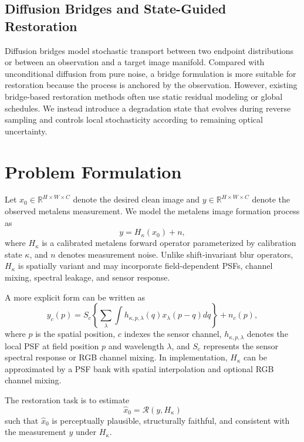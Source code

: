 \documentclass[journal]{IEEEtran}
\newcommand{\R}{\mathbb{R}}
\newcommand{\hk}{H_{\kappa}}
\begin{document}
\subsection{Diffusion Bridges and State-Guided Restoration}
Diffusion bridges model stochastic transport between two endpoint distributions or between an observation and a target image manifold. Compared with unconditional diffusion from pure noise, a bridge formulation is more suitable for restoration because the process is anchored by the observation. However, existing bridge-based restoration methods often use static residual modeling or global schedules. We instead introduce a degradation state that evolves during reverse sampling and controls local stochasticity according to remaining optical uncertainty.

\section{Problem Formulation}
Let $x_0 \in \R^{H\times W\times C}$ denote the desired clean image and $y \in \R^{H\times W\times C}$ denote the observed metalens measurement. We model the metalens image formation process as
\begin{equation}
    y = \hk(x_0) + n,
    \label{eq:forward_basic}
\end{equation}
where $\hk$ is a calibrated metalens forward operator parameterized by calibration state $\kappa$, and $n$ denotes measurement noise. Unlike shift-invariant blur operators, $\hk$ is spatially variant and may incorporate field-dependent PSFs, channel mixing, spectral leakage, and sensor response.

A more explicit form can be written as
\begin{equation}
    y_c(p)=S_c\left\{\sum_{\lambda}\int h_{\kappa,p,\lambda}(q)x_{\lambda}(p-q)dq\right\}+n_c(p),
    \label{eq:forward_explicit}
\end{equation}
where $p$ is the spatial position, $c$ indexes the sensor channel, $h_{\kappa,p,\lambda}$ denotes the local PSF at field position $p$ and wavelength $\lambda$, and $S_c$ represents the sensor spectral response or RGB channel mixing. In implementation, $\hk$ can be approximated by a PSF bank with spatial interpolation and optional RGB channel mixing.

The restoration task is to estimate
\begin{equation}
    \hat{x}_0 = \mathcal{R}(y,\hk)
\end{equation}
such that $\hat{x}_0$ is perceptually plausible, structurally faithful, and consistent with the measurement $y$ under $\hk$.
\end{document}
